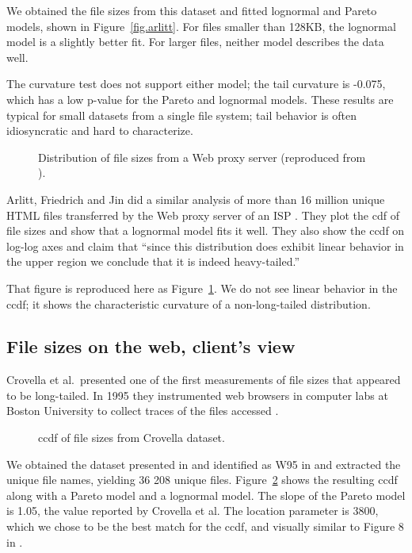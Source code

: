 \documentclass{elsart}
\begin{document}
We obtained the file sizes from this dataset and fitted lognormal
and Pareto models, shown in
Figure~\ref{fig.arlitt}.  For
files smaller than 128KB, the lognormal model is a slightly better
fit.  For larger files, neither model describes the data well.

The curvature test does not support either model; the tail curvature
is -0.075, which has a low p-value for the Pareto and lognormal
models.  These results are typical for small datasets from a single
file system; tail behavior is often idiosyncratic and
hard to characterize.

\begin{figure}[tb]
\centerline{}
\caption{
Distribution of file sizes from a Web proxy server
(reproduced from \cite{ArlittFriedrichJin98}).}
\label{fig.arlitt3}
\end{figure}

Arlitt, Friedrich and Jin did a similar analysis of more than 16
million unique HTML files transferred by the Web proxy server of an
ISP \cite{ArlittFriedrichJin98}.  They plot the cdf of file sizes and
show that a lognormal model fits it well.  They also show the ccdf on
log-log axes and claim that ``since this distribution does exhibit
linear behavior in the upper region we conclude that it is indeed
heavy-tailed.''

That figure is reproduced here as Figure~\ref{fig.arlitt3}.  We do not
see linear behavior in the ccdf; it shows the
characteristic curvature of a non-long-tailed distribution.


\subsection {File sizes on the web, client's view}
\label{webclient}

Crovella et al.~presented one of the first measurements of file sizes
that appeared to be long-tailed.  In 1995 they instrumented web
browsers in computer labs at Boston University to collect traces of
the files accessed \cite{CunhaBestavrosCrovella95}
\cite{CrovellaBestavros96} \cite{BarfordBestavrosBradleyCrovella99}.  

\begin{figure}[tb]
\centerline{}
\caption{
ccdf of file sizes from Crovella dataset.}
\label{fig.crovella}
\end{figure}

We obtained the dataset presented in \cite{CrovellaBestavros96} and
identified as W95 in \cite{BarfordBestavrosBradleyCrovella99} and
extracted the unique file names, yielding 36 208 unique files.
Figure~\ref{fig.crovella} shows the resulting ccdf along with a Pareto
model and a lognormal model.  The slope of the Pareto model is 1.05,
the value reported by Crovella et al.  The location parameter is 3800,
which we chose to be the best match for the ccdf, and visually similar
to Figure 8 in \cite{CrovellaBestavros96}.
\end{document}
